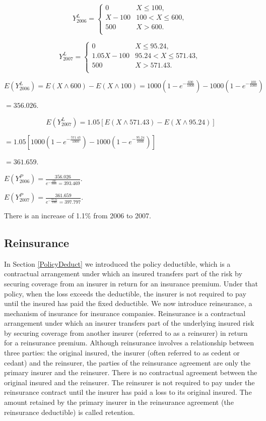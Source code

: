 \documentclass[]{book}
\theoremstyle{definition}
\theoremstyle{definition}
\theoremstyle{definition}
\theoremstyle{remark}
\begin{document}
\[Y_{2006}^{L} = \left\{ \begin{matrix}
0 & X \leq 100, \\
X - 100 & 100 <  X \leq 600, \\
500 & X > 600. \\
\end{matrix} \right.\ \]

\[Y_{2007}^{L} = \left\{ \begin{matrix}
0 & X \leq 95.24, \\
1.05X - 100 & 95.24 <  X \leq 571.43, \\
500 & X > 571.43. \\
\end{matrix} \right.\ \]

\[E\left( Y_{2006}^{L} \right) = E\left( X \land 600 \right) - E\left( X \land 100 \right) = 1000\left( {1 - e}^{- \frac{600}{1000}} \right) - 1000\left( {1 - e}^{- \frac{100}{1000}} \right)\]

\(= 356.026\).

\[E\left( Y_{2007}^{L} \right) = 1.05\left\lbrack E\left( X \land 571.43 \right) - E\left( X \land 95.24 \right) \right\rbrack\]

\(= 1.05\left\lbrack 1000\left( {1 - e}^{- \frac{571.43}{1000}} \right) - 1000\left( {1 - e}^{- \frac{95.24}{1000}} \right) \right\rbrack\)

\(\mathbf{=}361.659\).

\(E\left( Y_{2006}^{P} \right) = \frac{356.026}{e^{- \frac{100}{1000}} = 393.469}\).

\(E\left( Y_{2007}^{P} \right) = \frac{361.659}{e^{- \frac{95.24}{1000}} = 397.797}\).

There is an increase of 1.1\% from 2006 to 2007.

\subsection{Reinsurance}\label{reinsurance}

In Section \ref{PolicyDeduct} we introduced the policy deductible, which
is a contractual arrangement under which an insured transfers part of
the risk by securing coverage from an insurer in return for an insurance
premium. Under that policy, when the loss exceeds the deductible, the
insurer is not required to pay until the insured has paid the fixed
deductible. We now introduce reinsurance, a mechanism of insurance for
insurance companies. Reinsurance is a contractual arrangement under
which an insurer transfers part of the underlying insured risk by
securing coverage from another insurer (referred to as a reinsurer) in
return for a reinsurance premium. Although reinsurance involves a
relationship between three parties: the original insured, the insurer
(often referred to as cedent or cedant) and the reinsurer, the parties
of the reinsurance agreement are only the primary insurer and the
reinsurer. There is no contractual agreement between the original
insured and the reinsurer. The reinsurer is not required to pay under
the reinsurance contract until the insurer has paid a loss to its
original insured. The amount retained by the primary insurer in the
reinsurance agreement (the reinsurance deductible) is called retention.
\end{document}
